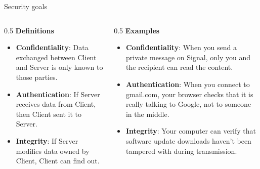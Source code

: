 \ifdefined\PRESENTATION\else\PassOptionsToClass{handout}{beamer}\fi\documentclass[aspectratio=169, lualatex]{beamer}
\begin{document}
\begin{frame}{Security goals}
	\begin{columns}[c]
		\begin{column}{0.5\textwidth}
			\textbf{Definitions}
			\begin{itemize}[<+->]
				\item \textbf{Confidentiality}: Data exchanged between Client and Server
				      is only known to those parties.
				\item \textbf{Authentication}: If Server receives data from Client,
				      then Client sent it to Server.
				\item \textbf{Integrity}: If Server modifies data owned by Client,
				      Client can find out.
			\end{itemize}
		\end{column}

		\begin{column}{0.5\textwidth}
			\textbf{Examples}
			\begin{itemize}[<+->]
				\item \textbf{Confidentiality}: When you send a private message on Signal,
				      only you and the recipient can read the content.
				\item \textbf{Authentication}: When you connect to gmail.com, your browser
				      checks that it is really talking to Google, not to someone in the middle.
				\item \textbf{Integrity}: Your computer can verify that software update
				      downloads haven't been tampered with during transmission.
			\end{itemize}
		\end{column}
	\end{columns}
\end{frame}
\end{document}
